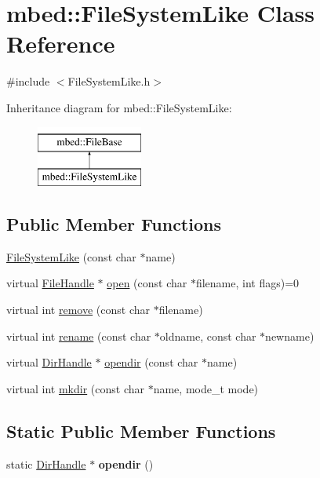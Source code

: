 \hypertarget{classmbed_1_1FileSystemLike}{}\section{mbed\+:\+:File\+System\+Like Class Reference}
\label{classmbed_1_1FileSystemLike}


{\ttfamily \#include $<$File\+System\+Like.\+h$>$}

Inheritance diagram for mbed\+:\+:File\+System\+Like\+:\begin{figure}[H]
\begin{center}
\leavevmode
\includegraphics[height=2.000000cm]{classmbed_1_1FileSystemLike}
\end{center}
\end{figure}
\subsection*{Public Member Functions}
\begin{DoxyCompactItemize}
\item 
\hyperlink{classmbed_1_1FileSystemLike_adaf42774569bda270f4f686623722b19}{File\+System\+Like} (const char $\ast$name)
\item 
virtual \hyperlink{classmbed_1_1FileHandle}{File\+Handle} $\ast$ \hyperlink{classmbed_1_1FileSystemLike_a6809574c7498d7683c6576977ffd3b4b}{open} (const char $\ast$filename, int flags)=0
\item 
virtual int \hyperlink{classmbed_1_1FileSystemLike_af3db57c1a612e1ca59c88da3488194ee}{remove} (const char $\ast$filename)
\item 
virtual int \hyperlink{classmbed_1_1FileSystemLike_a32cef6f224a3fa357d8e7e1d59002f16}{rename} (const char $\ast$oldname, const char $\ast$newname)
\item 
virtual \hyperlink{classmbed_1_1DirHandle}{Dir\+Handle} $\ast$ \hyperlink{classmbed_1_1FileSystemLike_a7e07c43201e03d0b3d0ecebd0c40bf04}{opendir} (const char $\ast$name)
\item 
virtual int \hyperlink{classmbed_1_1FileSystemLike_ac397d79d5aead33cdda1070ef3f56b38}{mkdir} (const char $\ast$name, mode\+\_\+t mode)
\end{DoxyCompactItemize}
\subsection*{Static Public Member Functions}
\begin{DoxyCompactItemize}
\item 
static \hyperlink{classmbed_1_1DirHandle}{Dir\+Handle} $\ast$ {\bfseries opendir} ()\hypertarget{classmbed_1_1FileSystemLike_a28c58dc431a4d00696a230b160882d32}{}\label{classmbed_1_1FileSystemLike_a28c58dc431a4d00696a230b160882d32}

\end{DoxyCompactItemize}
